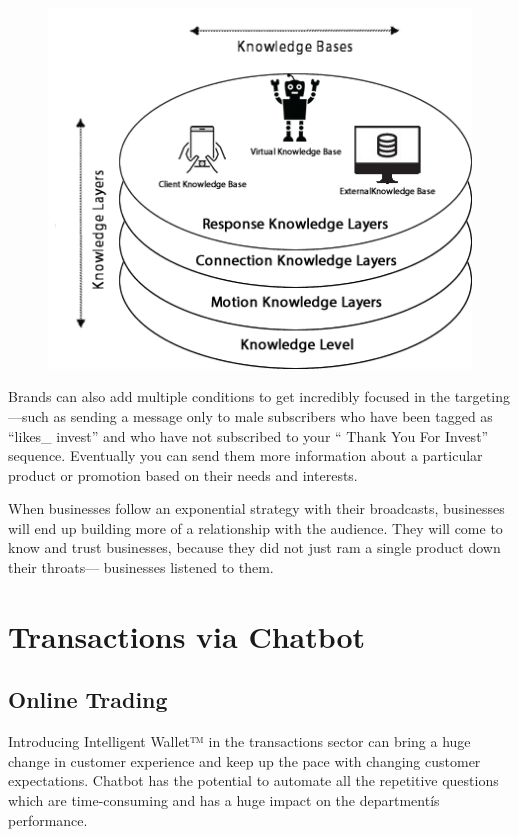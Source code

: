 \documentclass[	DIV=calc,%
							paper=letter,%
							fontsize=12pt%
                            ]{scrartcl}	 					%
\begin{document}
\begin{figure}[H]
\centering
\includegraphics[scale=0.80]{img/ds.png}
\caption{ \cite{borzestowski2012systems}}
\label{ds}
\end{figure}




Brands can also add multiple conditions to get incredibly focused in the targeting —such as sending a message only to male subscribers who have been tagged as ``likes\_ invest'' and who have not subscribed to your `` Thank You For Invest'' sequence. Eventually you can send them more information about a particular product or promotion based on their needs and interests.

When businesses follow an exponential strategy with their broadcasts, businesses will end up building more of a relationship with the audience. They will come to know and trust businesses, because they did not just ram a single product down their throats— businesses listened to them.




\section{\label{sec:level1}Transactions via Chatbot}

\subsection{\label{sec:level1}Online Trading}

Introducing Intelligent Wallet™ in the transactions sector can bring a huge change in customer experience and keep up the pace with changing customer expectations. Chatbot has the potential to automate all the repetitive questions which are time-consuming and has a huge impact on the departmentís performance. 
\end{document}
